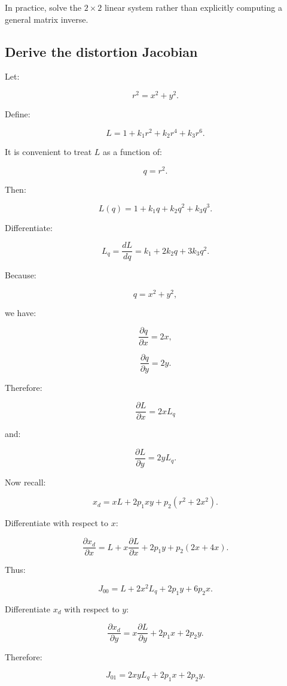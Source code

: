 In practice, solve the \(2\times2\) linear system rather than explicitly computing a general matrix inverse.

\subsection{Derive the distortion Jacobian}\label{02-foundations-ii-ch035-derive-the-distortion-jacobian}

\hypertarget{02-foundations-ii-ch035-derive-the-distortion-jacobian}{}

Let:

\[
 r^2=x^2+y^2.
\]

Define:

\[
 L=1+k_1r^2+k_2r^4+k_3r^6.
\]

It is convenient to treat \(L\) as a function of:

\[
 q=r^2.
\]

Then:

\[
 L(q)=1+k_1q+k_2q^2+k_3q^3.
\]

Differentiate:

\[
 \boxed{ L_q=\frac{dL}{dq} = k_1+2k_2q+3k_3q^2 }.
\]

Because:

\[
 q=x^2+y^2,
\]

we have:

\[
 \frac{\partial q}{\partial x}=2x,
\]

\[
 \frac{\partial q}{\partial y}=2y.
\]

Therefore:

\[
 \boxed{ \frac{\partial L}{\partial x}=2xL_q }
\]

and:

\[
 \boxed{ \frac{\partial L}{\partial y}=2yL_q }.
\]

Now recall:

\[
 x_d=xL+2p_1xy+p_2(r^2+2x^2).
\]

Differentiate with respect to \(x\):

\[
 \frac{\partial x_d}{\partial x} = L+x\frac{\partial L}{\partial x} +2p_1y +p_2(2x+4x).
\]

Thus:

\[
 \boxed{ J_{00}= L+2x^2L_q+2p_1y+6p_2x }.
\]

Differentiate \(x_d\) with respect to \(y\):

\[
 \frac{\partial x_d}{\partial y} = x\frac{\partial L}{\partial y} +2p_1x +2p_2y.
\]

Therefore:

\[
 \boxed{ J_{01}= 2xyL_q+2p_1x+2p_2y }.
\]

